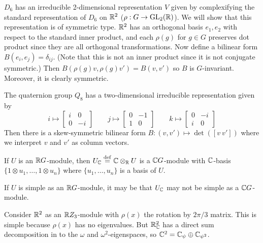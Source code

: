 \begin{exam}
  \lv
  \begin{enum}
    \io
    $D_6$ has an irreducible 2-dimensional representation $V$ given by complexifying the standard representation of $D_6$ on $\mathbb{R}^2$ ($\rho: G \to \operatorname{GL}_2(\mathbb{R})$).
    We will show that this representation is of symmetric type.
    $\mathbb{R}^2$ has an orthogonal basis $e_1,e_2$ with respect to the standard inner product, and each $\rho(g)$ for $g \in G$ preserves dot product since they are all orthogonal transformations.
    Now define a bilinear form $B(e_i,e_j)=\delta_{ij}$.
    (Note that this is not an inner product since it is not conjugate symmetric.)
    Then $B\left( \rho(g)v,\rho(g)v' \right) = B(v,v')$ so $B$ is $G$-invariant.
    Moreover, it is clearly symmetric.

    \io
    The quaternion group $Q_8$ has a two-dimensional irreducible representation given by
    \begin{equation*}
      i\mapsto
      \begin{bmatrix}
	i & 0 \\
	0 & -i
      \end{bmatrix}
      \qquad
      j\mapsto
      \begin{bmatrix}
	0 & -1 \\
	1 & 0
      \end{bmatrix}
      \qquad
      k\mapsto
      \begin{bmatrix}
	0 & -i \\
	i & 0
      \end{bmatrix}
    \end{equation*}
    Then there is a skew-symmetric bilinear form $B: (v,v') \mapsto \det([v\ v'])$ where we interpret $v$ and $v'$ as column vectors.
  \end{enum}
\end{exam}

\begin{defn}
  If $U$ is an $\mathbb{R} G$-module, then $U_{\mathbb{C}} \overset{\mathrm{def}}{=} \mathbb{C} \otimes_{\mathbb{R}} U$ is a $\mathbb{C} G$-module with $\mathbb{C}$-basis $\{1 \otimes u_1,\ldots,1 \otimes u_n\}$ where $\{u_1,\ldots,u_n\}$ is a basis of $U$.
\end{defn}

\begin{rmk}
  If $U$ is simple as an $\mathbb{R} G$-module, it may be that $U_{\mathbb{C}}$ may not be simple as a $\mathbb{C} G$-module.
\end{rmk}

\begin{exam}
  Consider $\mathbb{R}^2$ as an $\mathbb{R} Z_3$-module with $\rho(x)$ the rotation by $2\pi/3$ matrix.
  This is simple because $\rho(x)$ has no eigenvalues.
  But $\mathbb{R}^2_{\mathbb{C}}$ has a direct sum decomposition in to the $\omega$ and $\omega^2$-eigenspaces, so $\mathbb{C}^2 = \mathbb{C}_\psi \oplus \mathbb{C}_{\psi^2}$.
\end{exam}

